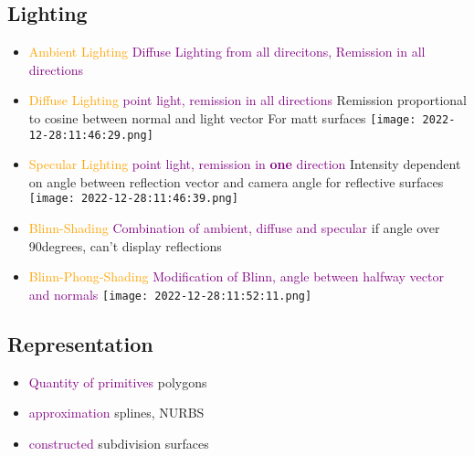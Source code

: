 \documentclass[main.tex,fontsize=12pt,paper=a4,paper=landscape,DIV=calc,]{scrartcl}
\begin{document}
\begin{multicols*}{4}
\subsection{Lighting}
\begin{itemize}
\item \textcolor{orange}{Ambient Lighting}\newline
\textcolor{purple}{Diffuse Lighting from all direcitons, Remission in all directions}\newline
\item \textcolor{orange}{Diffuse Lighting}\newline
\textcolor{purple}{point light, remission in all directions}\newline
Remission proportional to cosine between normal and light vector\newline
\textcolor{OliveGreen}{For matt surfaces}\newline
\texttt{[image: 2022-12-28:11:46:29.png]}
\item \textcolor{orange}{Specular Lighting}\newline
\textcolor{purple}{point light, remission in \textbf{one} direction}\newline
Intensity dependent on angle between reflection vector and camera angle\newline
\textcolor{OliveGreen}{for reflective surfaces}\newline
\texttt{[image: 2022-12-28:11:46:39.png]}
\item \textcolor{orange}{Blinn-Shading}\newline
  \textcolor{purple}{Combination of ambient, diffuse and specular}\newline
  if angle over 90degrees, can't display reflections
\item \textcolor{orange}{Blinn-Phong-Shading}\newline
  \textcolor{purple}{Modification of Blinn, angle between halfway vector and normals}\newline
  \texttt{[image: 2022-12-28:11:52:11.png]}
\end{itemize} 

\subsection{Representation}
\begin{itemize}
\item \textcolor{purple}{Quantity of primitives} polygons
\item \textcolor{purple}{approximation} splines, NURBS
\item \textcolor{purple}{constructed} subdivision surfaces
\end{itemize} 


\end{multicols*}
\end{document}
